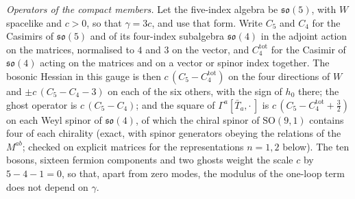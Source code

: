 \emph{Operators of the compact members.} Let the five-index algebra be \(\mathfrak{so}(5)\), with \(W\) spacelike and \(c>0\), so that \(\gamma=3c\), and use that form. Write \(C_5\) and \(C_4\) for the Casimirs of \(\mathfrak{so}(5)\) and of its four-index subalgebra \(\mathfrak{so}(4)\) in the adjoint action on the matrices, normalised to \(4\) and \(3\) on the vector, and \(C_4^{\mathrm{tot}}\) for the Casimir of \(\mathfrak{so}(4)\) acting on the matrices and on a vector or spinor index together. The bosonic Hessian in this gauge is then \(c\,(C_5-C_4^{\mathrm{tot}})\) on the four directions of \(W\) and \(\pm c\,(C_5-C_4-3)\) on each of the six others, with the sign of \(h_0\) there; the ghost operator is \(c\,(C_5-C_4)\); and the square of \(\Gamma^a[\bar T_a,\cdot\,]\) is \(c\,(C_5-C_4^{\mathrm{tot}}+\tfrac32)\) on each Weyl spinor of \(\mathfrak{so}(4)\), of which the chiral spinor of \(\mathrm{SO}(9,1)\) contains four of each chirality (exact, with spinor generators obeying the relations of the \(M^{ab}\); checked on explicit matrices for the representations \(n=1,2\) below). The ten bosons, sixteen fermion components and two ghosts weight the scale \(c\) by \(5-4-1=0\), so that, apart from zero modes, the modulus of the one-loop term does not depend on \(\gamma\).

